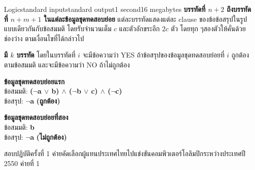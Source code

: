\documentclass[11pt,a4paper]{article}
\begin{document}
\begin{problem}{Logic}{standard input}{standard output}{1 second}{16 megabytes}
\textbf{บรรทัดที่ $n+2$ ถึงบรรทัดที่ $n+m+1$ ในแต่ละข้อมูลชุดทดสอบย่อย} แต่ละบรรทัดแสดงแต่ละ clause ของข้อข้อสรุปในรูปแบบเดียวกันกับข้อสมมติ โดยรับจำนวนเต็ม $c$ และตัวอักขระอีก $2c$ ตัว โดยทุก ๆสองตัวให้คั่นด้วยช่องว่าง ตามเงื่อนไขที่ได้กล่าวไป

\OutputFile

\textbf{มี $k$ บรรทัด} โดยในบรรทัดที่ $i$ จะมีข้อความว่า YES ถ้าข้อสรุปของข้อมูลชุดทดสอบย่อยที่ $i$ ถูกต้องตามข้อสมมติ  และจะมีข้อความว่า NO ถ้าไม่ถูกต้อง

\Examples

\begin{example}
%
\end{example}

\Note 

\textbf{ข้อมูลชุดทดสอบย่อยแรก}\\
ข้อสมมติ:  \textbf{($\neg$a $\lor$ b) $\land$ ($\neg$b $\lor$ c) $\land$ ($\neg$c)}\\
ข้อสรุป:  \textbf{$\neg$a} \textbf{(ถูกต้อง)}

\textbf{ข้อมูลชุดทดสอบย่อยที่สอง}\\
ข้อสมมติ:  \textbf{b}\\
ข้อสรุป:  \textbf{$\neg$a }   \textbf{(ไม่ถูกต้อง)}

\Source

สอบปฏิบัติครั้งที่ 1 ค่ายคัดเลือกผู้แทนประเทศไทยไปแข่งขันคอมพิวเตอร์โอลิมปิกระหว่างประเทศปี 2550 ค่ายที่ 1

\end{problem}
\end{document}
